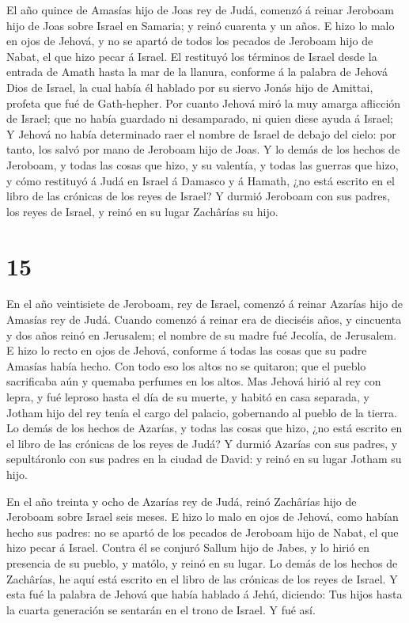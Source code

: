  El año quince de Amasías hijo de Joas rey de Judá, comenzó
á reinar Jeroboam hijo de Joas sobre Israel en Samaria; y reinó cuarenta
y un años.  E hizo lo malo en ojos de Jehová, y no se
apartó de todos los pecados de Jeroboam hijo de Nabat, el que hizo pecar
á Israel.  El restituyó los términos de Israel desde la
entrada de Amath hasta la mar de la llanura, conforme á la palabra de
Jehová Dios de Israel, la cual había él hablado por su siervo Jonás hijo
de Amittai, profeta que fué de Gath-hepher.  Por cuanto
Jehová miró la muy amarga aflicción de Israel; que no había guardado ni
desamparado, ni quien diese ayuda á Israel;  Y Jehová no
había determinado raer el nombre de Israel de debajo del cielo: por
tanto, los salvó por mano de Jeroboam hijo de Joas.  Y lo
demás de los hechos de Jeroboam, y todas las cosas que hizo, y su
valentía, y todas las guerras que hizo, y cómo restituyó á Judá en
Israel á Damasco y á Hamath, ¿no está escrito en el libro de las
crónicas de los reyes de Israel?  Y durmió Jeroboam con sus
padres, los reyes de Israel, y reinó en su lugar Zachârías su hijo.

\hypertarget{section-14}{%
\section{15}\label{section-14}}

 En el año veintisiete de Jeroboam, rey de Israel, comenzó á
reinar Azarías hijo de Amasías rey de Judá.  Cuando comenzó
á reinar era de dieciséis años, y cincuenta y dos años reinó en
Jerusalem; el nombre de su madre fué Jecolía, de Jerusalem. 
E hizo lo recto en ojos de Jehová, conforme á todas las cosas que su
padre Amasías había hecho.  Con todo eso los altos no se
quitaron; que el pueblo sacrificaba aún y quemaba perfumes en los altos.
 Mas Jehová hirió al rey con lepra, y fué leproso hasta el
día de su muerte, y habitó en casa separada, y Jotham hijo del rey tenía
el cargo del palacio, gobernando al pueblo de la tierra.  Lo
demás de los hechos de Azarías, y todas las cosas que hizo, ¿no está
escrito en el libro de las crónicas de los reyes de Judá?  Y
durmió Azarías con sus padres, y sepultáronlo con sus padres en la
ciudad de David: y reinó en su lugar Jotham su hijo.

 En el año treinta y ocho de Azarías rey de Judá, reinó
Zachârías hijo de Jeroboam sobre Israel seis meses.  E hizo
lo malo en ojos de Jehová, como habían hecho sus padres: no se apartó de
los pecados de Jeroboam hijo de Nabat, el que hizo pecar á Israel.
 Contra él se conjuró Sallum hijo de Jabes, y lo hirió en
presencia de su pueblo, y matólo, y reinó en su lugar.  Lo
demás de los hechos de Zachârías, he aquí está escrito en el libro de
las crónicas de los reyes de Israel.  Y esta fué la palabra
de Jehová que había hablado á Jehú, diciendo: Tus hijos hasta la cuarta
generación se sentarán en el trono de Israel. Y fué así.

